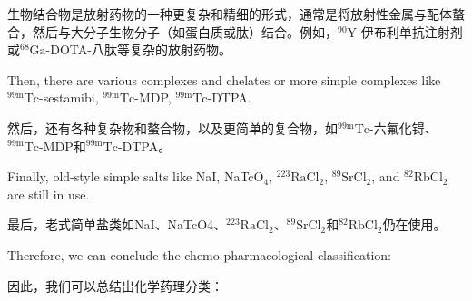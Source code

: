 \documentclass[dvipsnames, svgnames,a4paper,11pt]{article}
\begin{document}
生物结合物是放射药物的一种更复杂和精细的形式，通常是将放射性金属与配体螯合，然后与大分子生物分子（如蛋白质或肽）结合。例如，${}^\text{90}\text{Y}$-伊布利单抗注射剂或${}^\text{68}\text{Ga}$-DOTA-八肽等复杂的放射药物。


Then, there are various complexes and chelates or more simple complexes like \(\mathrm{^{99m}Tc}\)-sestamibi, \(\mathrm{^{99m}Tc}\)-MDP, \(\mathrm{^{99m}Tc}\)-DTPA.  

然后，还有各种复杂物和螯合物，以及更简单的复合物，如${}^\text{99m}\text{Tc}$-六氟化锝、${}^\text{99m}\text{Tc}$-MDP和${}^\text{99m}\text{Tc}$-DTPA。

Finally, old-style simple salts like NaI, NaTcO\(_4\), \(\mathrm{^{223}Ra}\)Cl\(_2\), \(\mathrm{^{89}Sr}\)Cl\(_2\), and \(\mathrm{^{82}Rb}\)Cl\(_2\) are still in use.  

最后，老式简单盐类如NaI、NaTcO4、${}^\text{223}\text{RaCl}_2$、${}^\text{89}\text{SrCl}_2$和${}^\text{82}\text{RbCl}_2$仍在使用。

Therefore, we can conclude the chemo-pharmacological classification:

因此，我们可以总结出化学药理分类：
\end{document}
